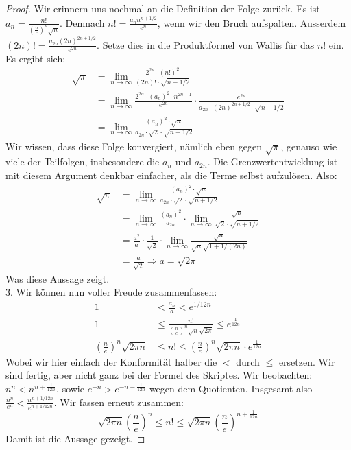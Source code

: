 \documentclass[10pt,fleqn]{article}
\theoremstyle{definition}
\theoremstyle{remark}
\begin{document}
\begin{proof}
    Wir erinnern uns nochmal an die Definition der Folge zurück. Es ist \(a_n = \frac{n!}{\left(\frac{n}{e}\right)^n \sqrt{n}}\). Demnach \(n! = \frac{a_n n^{n+1/2}}{e^n}\), wenn wir den Bruch aufspalten. Ausserdem \((2n)! = \frac{a_{2n} (2n)^{2n+1/2}}{e^{2n}}\). Setze dies in die Produktformel von Wallis für das \(n!\) ein. Es ergibt sich:
    \begin{align*}
        \sqrt{\pi} &= \lim_{n\to\infty} \frac{2^{2n}\cdot(n!)^2}{(2n)!\cdot\sqrt{n+1/2}}\\
        &= \lim_{n\to\infty} \frac{2^{2n}\cdot(a_n)^2\cdot n^{2n+1}}{e^{2n}} \cdot \frac{e^{2n}}{a_{2n}\cdot(2n)^{2n+1/2} \cdot \sqrt{n+1/2}}\\
        &= \lim_{n\to\infty} \frac{(a_n)^2\cdot\sqrt{n}}{a_{2n} \cdot \sqrt{2} \cdot \sqrt{n+1/2}}
    \end{align*}
    Wir wissen, dass diese Folge konvergiert, nämlich eben gegen \(\sqrt{\pi}\), genauso wie viele der Teilfolgen, insbesondere die \(a_n\) und \(a_{2n}\). Die Grenzwertentwicklung ist mit diesem Argument denkbar einfacher, als die Terme selbst aufzulösen. Also:
    \begin{align*}
        \sqrt{\pi} &= \lim_{n\to\infty} \frac{(a_n)^2\cdot\sqrt{n}}{a_{2n} \cdot \sqrt{2} \cdot \sqrt{n+1/2}}\\
        &= \lim_{n\to\infty} \frac{(a_n)^2}{a_{2n}} \cdot \lim_{n\to\infty} \frac{\sqrt{n}}{\sqrt{2} \cdot \sqrt{n+1/2}}\\
        &= \frac{a^2}{a} \cdot \frac{1}{\sqrt{2}} \cdot \lim_{n\to\infty}\frac{\sqrt{n}}{\sqrt{n}\sqrt{1+1/(2n)}}\\
        &= \frac{a}{\sqrt{2}} \Rightarrow a = \sqrt{2\pi}
    \end{align*}
    Was diese Aussage zeigt.\\
    
    3. Wir können nun voller Freude zusammenfassen:
    \begin{align*}
        1 &< \frac{a_n}{a} < e^{1/12n}\\
        1 &\leq \frac{n!}{\left(\frac{n}{e}\right)^n\sqrt{n}\sqrt{2\pi}} \leq e^{\frac{1}{12n}}\\
        \left(\frac{n}{e}\right)^n\sqrt{2 \pi n} &\leq n! \leq \left(\frac{n}{e}\right)^n\sqrt{2 \pi n} \cdot e^{\frac{1}{12n}}
    \end{align*}
    Wobei wir hier einfach der Konformität halber die \(<\) durch \(\leq\) ersetzen. Wir sind fertig, aber nicht ganz bei der Formel des Skriptes. Wir beobachten: \(n^n < n^{n+\frac{1}{12n}}\), sowie \(e^{-n} > e^{-n-\frac{1}{12n}}\) wegen dem Quotienten. Insgesamt also \(\frac{n^n}{e^n} < \frac{n^{n+1/12n}}{e^{n+1/12n}}\). Wir fassen erneut zusammen:
    \[
        \sqrt{2 \pi n} \left(\frac{n}{e}\right)^n \leq n! \leq \sqrt{2 \pi n} \left(\frac{n}{e}\right)^{n+\frac{1}{12n}}
    \]
    Damit ist die Aussage gezeigt.
\end{proof}
\end{document}
